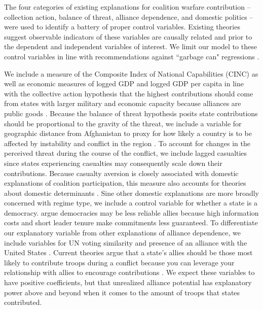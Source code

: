 \documentclass[12pt,letterpaper]{article}
\begin{document}
		The four categories of existing explanations for coalition warfare contribution -- collection action, balance of threat, alliance dependence, and domestic politics -- were used to identify a battery of proper control variables. Existing theories suggest observable indicators of these variables are causally related and prior to the dependent and independent variables of interest. We limit our model to these control variables in line with recommendations against ``garbage can" regressions \citep{ray_explaininginterstateconflict_2003, bleek_securityguaranteesallied_2014}.
		
		We include a measure of the Composite Index of National Capabilities (CINC) as well as economic measures of logged GDP and logged GDP per capita in line with the collective action hypothesis that the highest contributions should come from states with larger military and economic capacity because alliances are public goods \citep{olson_economictheoryalliances_1966, singer_capabilitydistributionuncertainty_1972}. Because the balance of threat hypothesis posits state contributions should be proportional to the gravity of the threat, we include a variable for geographic distance from Afghanistan to proxy for how likely a country is to be affected by instability and conflict in the region \citep{weidmann_geographyinternationalsystem_2010}. To account for changes in the perceived threat during the course of the conflict, we include lagged casualties since states experiencing casualties may consequently scale down their contributions. Because casualty aversion is closely associated with domestic explanations of coalition participation, this measure also accounts for theories about domestic determinants \citep{koch_casualtiesconstituenciesdemocratic_2005, jakobsen_denmarkafghanistanworth_2015}. Sine other domestic explanations are more broadly concerned with regime type, we include a control variable for whether a state is a democracy. \citet{gartzke_democracypreparationwar_2001, gartzke_whydemocraciesmay_2004} argue democracies may be less reliable allies because high information costs and short leader tenure make commitments less guaranteed. To differentiate our explanatory variable from other explanations of alliance dependence, we include variables for UN voting similarity and presence of an alliance with the United States \citep{bailey_estimatingdynamicstate_2017}. Current theories argue that a state's allies should be those most likely to contribute troops during a conflict because you can leverage your relationship with allies to encourage contributions \citep{davidson_neoclassicalrealistexplanation_2011}. We expect these variables to have positive coefficients, but that unrealized alliance potential has explanatory power above and beyond when it comes to the amount of troops that states contributed.
		
\end{document}
